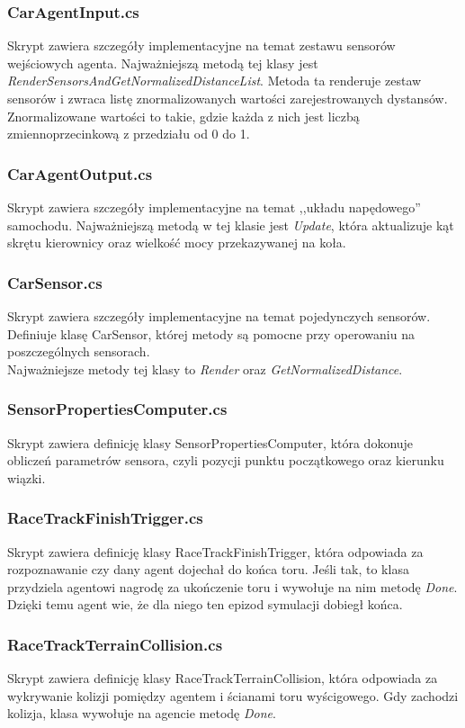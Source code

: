\subsubsection{CarAgentInput.cs}
Skrypt zawiera szczegóły implementacyjne na temat zestawu sensorów wejściowych agenta. Najważniejszą metodą tej klasy jest \textit{RenderSensorsAndGetNormalizedDistanceList}. Metoda ta renderuje zestaw sensorów i zwraca listę znormalizowanych wartości zarejestrowanych dystansów. Znormalizowane wartości to takie, gdzie każda z nich jest liczbą zmiennoprzecinkową z przedziału od 0 do 1.

\subsubsection{CarAgentOutput.cs}
Skrypt zawiera szczegóły implementacyjne na temat ,,układu napędowego'' samochodu. Najważniejszą metodą w tej klasie jest \textit{Update}, która aktualizuje kąt skrętu kierownicy oraz wielkość mocy przekazywanej na koła.

\subsubsection{CarSensor.cs}
Skrypt zawiera szczegóły implementacyjne na temat pojedynczych sensorów. Definiuje klasę CarSensor, której metody są pomocne przy operowaniu na poszczególnych sensorach. \\ Najważniejsze metody tej klasy to \textit{Render} oraz \textit{GetNormalizedDistance}.

\subsubsection{SensorPropertiesComputer.cs}
Skrypt zawiera definicję klasy SensorPropertiesComputer, która dokonuje obliczeń parametrów sensora, czyli pozycji punktu początkowego oraz kierunku wiązki.

\subsubsection{RaceTrackFinishTrigger.cs}
Skrypt zawiera definicję klasy RaceTrackFinishTrigger, która odpowiada za rozpoznawanie czy dany agent dojechał do końca toru.
Jeśli tak, to klasa przydziela agentowi nagrodę za ukończenie toru i wywołuje na nim metodę \textit{Done}. Dzięki temu agent wie, że dla niego ten epizod symulacji dobiegł końca.

\subsubsection{RaceTrackTerrainCollision.cs}
Skrypt zawiera definicję klasy RaceTrackTerrainCollision, która odpowiada za wykrywanie kolizji pomiędzy agentem i ścianami toru wyścigowego. Gdy zachodzi kolizja, klasa wywołuje na agencie metodę \textit{Done}.

